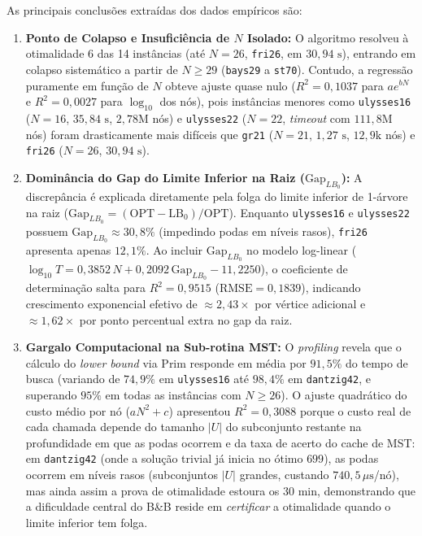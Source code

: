 \documentclass[12pt]{article}
\begin{document}
As principais conclusões extraídas dos dados empíricos são:

\begin{enumerate}
    \item \textbf{Ponto de Colapso e Insuficiência de $N$ Isolado:} O algoritmo resolveu à otimalidade 6 das 14 instâncias (até $N=26$, \texttt{fri26}, em $30{,}94\text{ s}$), entrando em colapso sistemático a partir de $N \ge 29$ (\texttt{bays29} a \texttt{st70}). Contudo, a regressão puramente em função de $N$ obteve ajuste quase nulo ($R^2 = 0{,}1037$ para $ae^{bN}$ e $R^2 = 0{,}0027$ para $\log_{10}$ dos nós), pois instâncias menores como \texttt{ulysses16} ($N=16$, $35{,}84\text{ s}$, $2{,}78\text{M}$ nós) e \texttt{ulysses22} ($N=22$, \textit{timeout} com $111{,}8\text{M}$ nós) foram drasticamente mais difíceis que \texttt{gr21} ($N=21$, $1{,}27\text{ s}$, $12{,}9\text{k}$ nós) e \texttt{fri26} ($N=26$, $30{,}94\text{ s}$).
    \item \textbf{Dominância do Gap do Limite Inferior na Raiz ($\mathrm{Gap}_{LB_0}$):} A discrepância é explicada diretamente pela folga do limite inferior de 1-árvore na raiz ($\mathrm{Gap}_{LB_0} = (\mathrm{OPT} - \mathrm{LB}_0)/\mathrm{OPT}$). Enquanto \texttt{ulysses16} e \texttt{ulysses22} possuem $\mathrm{Gap}_{LB_0} \approx 30{,}8\%$ (impedindo podas em níveis rasos), \texttt{fri26} apresenta apenas $12{,}1\%$. Ao incluir $\mathrm{Gap}_{LB_0}$ no modelo log-linear ($\log_{10} T = 0{,}3852\,N + 0{,}2092\,\mathrm{Gap}_{LB_0} - 11{,}2250$), o coeficiente de determinação salta para $R^2 = 0{,}9515$ ($\mathrm{RMSE} = 0{,}1839$), indicando crescimento exponencial efetivo de $\approx 2{,}43\times$ por vértice adicional e $\approx 1{,}62\times$ por ponto percentual extra no gap da raiz.
    \item \textbf{Gargalo Computacional na Sub-rotina MST:} O \textit{profiling} revela que o cálculo do \textit{lower bound} via Prim responde em média por $91{,}5\%$ do tempo de busca (variando de $74{,}9\%$ em \texttt{ulysses16} até $98{,}4\%$ em \texttt{dantzig42}, e superando $95\%$ em todas as instâncias com $N \ge 26$). O ajuste quadrático do custo médio por nó ($aN^2 + c$) apresentou $R^2 = 0{,}3088$ porque o custo real de cada chamada depende do tamanho $|U|$ do subconjunto restante na profundidade em que as podas ocorrem e da taxa de acerto do cache de MST: em \texttt{dantzig42} (onde a solução trivial já inicia no ótimo $699$), as podas ocorrem em níveis rasos (subconjuntos $|U|$ grandes, custando $740{,}5\,\mu\text{s}$/nó), mas ainda assim a prova de otimalidade estoura os $30\text{ min}$, demonstrando que a dificuldade central do B\&B reside em \textit{certificar} a otimalidade quando o limite inferior tem folga.

\end{enumerate}
\end{document}
